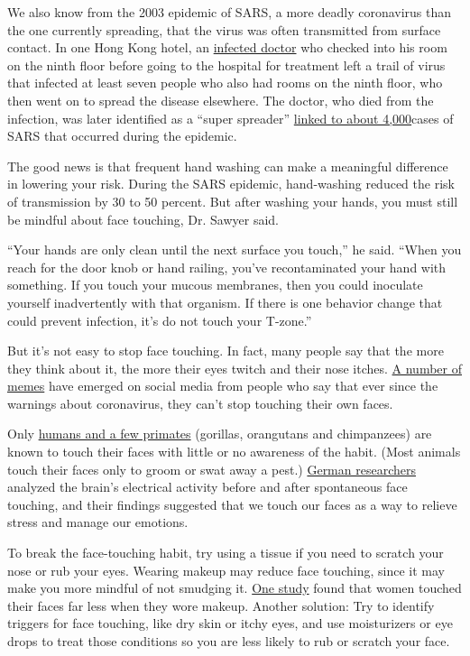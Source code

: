 We also know from the 2003 epidemic of SARS, a more deadly coronavirus
than the one currently spreading, that the virus was often transmitted
from surface contact. In one Hong Kong hotel, an
\href{https://www.who.int/csr/don/2003_07_04/en/}{infected doctor} who
checked into his room on the ninth floor before going to the hospital
for treatment left a trail of virus that infected at least seven people
who also had rooms on the ninth floor, who then went on to spread the
disease elsewhere. The doctor, who died from the infection, was later
identified as a ``super spreader''
\href{https://www.cnbc.com/2020/02/14/hong-kong-hotel-hosted-super-spreader-in-the-2003-sars-outbreak.html}{linked
to about 4,000}cases of SARS that occurred during the epidemic.

The good news is that frequent hand washing can make a meaningful
difference in lowering your risk. During the SARS epidemic, hand-washing
reduced the risk of transmission by 30 to 50 percent. But after washing
your hands, you must still be mindful about face touching, Dr. Sawyer
said.

``Your hands are only clean until the next surface you touch,'' he said.
``When you reach for the door knob or hand railing, you've
recontaminated your hand with something. If you touch your mucous
membranes, then you could inoculate yourself inadvertently with that
organism. If there is one behavior change that could prevent infection,
it's do not touch your T-zone.''

But it's not easy to stop face touching. In fact, many people say that
the more they think about it, the more their eyes twitch and their nose
itches.
\href{https://mashable.com/article/coronavirus-prevention-dont-touch-your-face/}{A
number of memes} have emerged on social media from people who say that
ever since the warnings about coronavirus, they can't stop touching
their own faces.

Only \href{https://www.ncbi.nlm.nih.gov/pubmed/6427652}{humans and a few
primates} (gorillas, orangutans and chimpanzees) are known to touch
their faces with little or no awareness of the habit. (Most animals
touch their faces only to groom or swat away a pest.)
\href{https://www.ncbi.nlm.nih.gov/pubmed/24530432}{German researchers}
analyzed the brain's electrical activity before and after spontaneous
face touching, and their findings suggested that we touch our faces as a
way to relieve stress and manage our emotions.

To break the face-touching habit, try using a tissue if you need to
scratch your nose or rub your eyes. Wearing makeup may reduce face
touching, since it may make you more mindful of not smudging it.
\href{https://search.proquest.com/openview/e2c136dc5c05115cdf9e55cb5133bc46/1?cbl=2040555\&pq-origsite=gscholar}{One
study} found that women touched their faces far less when they wore
makeup. Another solution: Try to identify triggers for face touching,
like dry skin or itchy eyes, and use moisturizers or eye drops to treat
those conditions so you are less likely to rub or scratch your face.

